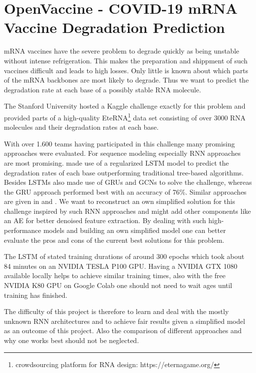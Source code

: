 \section{OpenVaccine - COVID-19 mRNA Vaccine Degradation Prediction} \label{proposal2}

mRNA vaccines have the severe problem to degrade quickly as being unstable without intense refrigeration. This makes the preparation and shippment of such vaccines difficult and leads to high losses. Only little is known about which parts of the mRNA backbones are most likely to degrade. Thus we want to predict the degradation rate at each base of a possibly stable RNA molecule. 

The Stanford University hosted a Kaggle challenge exactly for this problem \cite{Kaggle2020} and provided parts of a high-quality EteRNA\footnote{crowdsourcing platform for RNA design: https://eternagame.org/} data set consisting of over 3000 RNA molecules and their degradation rates at each base.

With over 1.600 teams having participated in this challenge many promising approaches were evaluated. For sequence modeling especially \ac{RNN} approaches are most promising. \cite{Imran2021} made use of a regularized LSTM model to predict the degradation rates of each base outperforming traditional tree-based algorithms. Besides \ac{LSTM}s \cite{Singhal2021} also made use of \ac{GRU}s and \ac{GCN}s to solve the challenge, whereas the \ac{GRU} approach performed best with an accuracy of 76\%. Similar approaches are given in \cite{Qaid2021} and \cite{Vandewiele2020}. We want to reconstruct an own simplified solution for this challenge inspired by such \ac{RNN} approaches and might add other components like an \ac{AE} for better denoised feature extraction. By dealing with such high-performance models and building an own simplified model one can better evaluate the pros and cons of the current best solutions for this problem. 

The LSTM of \cite{Imran2021} stated training durations of around 300 epochs which took about 84 minutes on an NVIDIA TESLA P100 GPU. Having a NVIDIA GTX 1080 available locally helps to achieve similar training times, also with the free NVIDIA K80 GPU on Google Colab one should not need to wait ages until training has finished. 

The difficulty of this project is therefore to learn and deal with the mostly unknown RNN architectures and to achieve fair results given a simplified model as an outcome of this project. Also the comparison of different approaches and why one works best should not be neglected. 